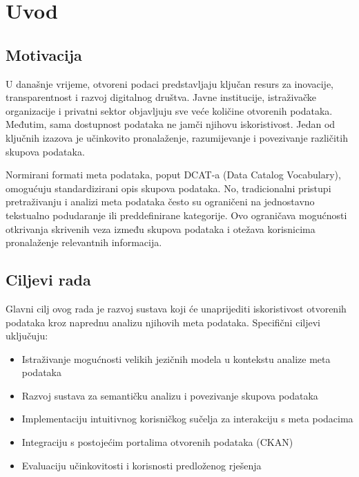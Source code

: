 \chapter{Uvod}
\label{ch:introduction}


\section{Motivacija}
\label{sec:motivation}

U današnje vrijeme, otvoreni podaci predstavljaju ključan resurs za inovacije, 
transparentnost i razvoj digitalnog društva. Javne institucije, istraživačke organizacije 
i privatni sektor objavljuju sve veće količine otvorenih podataka. Međutim, sama 
dostupnost podataka ne jamči njihovu iskoristivost. Jedan od ključnih izazova je 
učinkovito pronalaženje, razumijevanje i povezivanje različitih skupova podataka.

Normirani formati meta podataka, poput DCAT-a (Data Catalog Vocabulary), omogućuju 
standardizirani opis skupova podataka. No, tradicionalni pristupi pretraživanju i analizi 
meta podataka često su ograničeni na jednostavno tekstualno podudaranje ili preddefinirane 
kategorije. Ovo ograničava mogućnosti otkrivanja skrivenih veza između skupova podataka 
i otežava korisnicima pronalaženje relevantnih informacija.

\section{Ciljevi rada}
\label{sec:objectives}

Glavni cilj ovog rada je razvoj sustava koji će unaprijediti iskoristivost otvorenih 
podataka kroz naprednu analizu njihovih meta podataka. Specifični ciljevi uključuju:

\begin{itemize}
    \item Istraživanje mogućnosti velikih jezičnih modela u kontekstu analize meta podataka
    \item Razvoj sustava za semantičku analizu i povezivanje skupova podataka
    \item Implementaciju intuitivnog korisničkog sučelja za interakciju s meta podacima
    \item Integraciju s postojećim portalima otvorenih podataka (CKAN)
    \item Evaluaciju učinkovitosti i korisnosti predloženog rješenja
\end{itemize}

